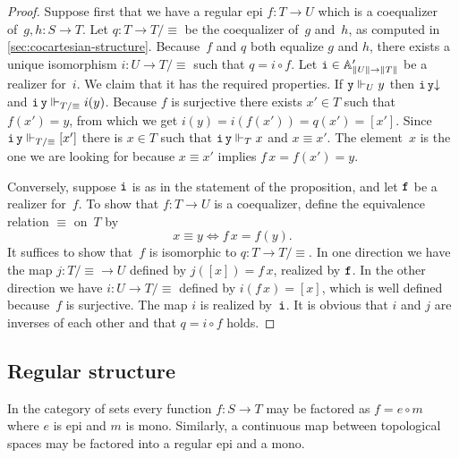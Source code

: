 \begin{proof}
  Suppose first that we have a regular epi $f : T \to U$
  which is a coequalizer of~$g, h : S \to T$. Let $q :
  T \to T/{\equiv}$ be the coequalizer of~$g$ and~$h$, as
  computed in \cref{sec:cocartesian-structure}. Because~$f$ and
  $q$ both equalize $g$ and $h$, there exists a unique isomorphism $i
  : U \to T/{\equiv}$ such that $q = i \circ f$. Let
  $\R{i} \in \subAtyp{\T{U} \to \T{T}}$ be a realizer for~$i$. We claim
  that it has the required properties. If $\R{y} \rz[U] y$ then
  $\defined{\R{i}\,\R{y}}$ and $\R{i}\,\R{y} \rz[T/{\equiv}] i(y)$.
  Because $f$ is surjective there exists $x' \in T$ such that $f(x') =
  y$, from which we get $i(y) = i(f(x')) = q(x') = [x']$. Since
  $\R{i}\,\R{y} \rz[T/{\equiv}] [x']$ there is $x \in T$ such that
  $\R{i}\,\R{y} \rz[T] x$ and $x \equiv x'$. The element~$x$ is the one
  we are looking for because $x \equiv x'$ implies $f\,x = f(x') = y$.

  Conversely, suppose $\R{i}$ is as in the statement of the
  proposition, and let $\R{f}$ be a realizer for~$f$. To show that $f
  : T \to U$ is a coequalizer, define the equivalence
  relation $\equiv$ on~$T$ by
  \begin{equation*}
    x \equiv y \iff f\,x = f(y).
  \end{equation*}
  It suffices to show that~$f$ is isomorphic to $q : T \to
  T/{\equiv}$. In one direction we have the map $j : T/{\equiv}
  \to U$ defined by $j([x]) = f\,x$, realized by $\R{f}$. In the other
  direction we have $i : U \to T/{\equiv}$ defined by $i(f\,x) = [x]$,
  which is well defined because~$f$ is surjective. The map $i$ is
  realized by~$\R{i}$. It is obvious that $i$ and $j$ are inverses of
  each other and that $q = i \circ f$ holds.
\end{proof}

\subsection{Regular structure}
\label{sec:regular-structure}

In the category of sets every function $f : S \to T$ may be factored
as $f = e \circ m$ where $e$ is epi and $m$ is mono. Similarly, a
continuous map between topological spaces may be factored into a
regular epi and a mono.


